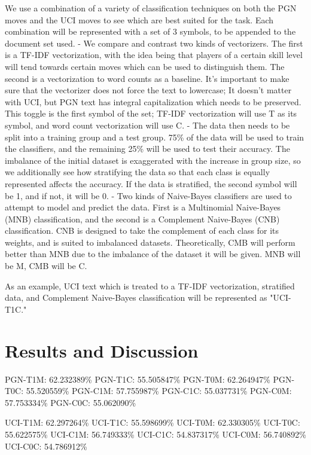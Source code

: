 \documentclass[conference]{IEEEtran}
\begin{document}
We use a combination of a variety of classification techniques on both the PGN moves and the UCI moves to see which are best suited for the task. Each combination will be represented with a set of 3 symbols, to be appended to the document set used.
- We compare and contrast two kinds of vectorizers. The first is a TF-IDF vectorization, with the idea being that players of a certain skill level will tend towards certain moves which can be used to distinguish them. The second is a vectorization to word counts as a baseline. It's important to make sure that the vectorizer does not force the text to lowercase; It doesn't matter with UCI, but PGN text has integral capitalization which needs to be preserved. This toggle is the first symbol of the set; TF-IDF vectorization will use T as its symbol, and word count vectorization will use C.
- The data then needs to be split into a training group and a test group. 75\% of the data will be used to train the classifiers, and the remaining 25\% will be used to test their accuracy. The imbalance of the initial dataset is exaggerated with the increase in group size, so we additionally see how stratifying the data so that each class is equally represented affects the accuracy. If the data is stratified, the second symbol will be 1, and if not, it will be 0.
- Two kinds of Naive-Bayes classifiers are used to attempt to model and predict the data. First is a Multinomial Naive-Bayes (MNB) classification, and the second is a Complement Naive-Bayes (CNB) classification. CNB is designed to take the complement of each class for its weights, and is suited to imbalanced datasets. Theoretically, CMB will perform better than MNB due to the imbalance of the dataset it will be given. MNB will be M, CMB will be C.

As an example, UCI text which is treated to a TF-IDF vectorization, stratified data, and Complement Naive-Bayes classification will be represented as "UCI-T1C."

\section{Results and Discussion}

PGN-T1M: 62.232389\%
PGN-T1C: 55.505847\%
PGN-T0M: 62.264947\%
PGN-T0C: 55.520559\%
PGN-C1M: 57.755987\%
PGN-C1C: 55.037731\%
PGN-C0M: 57.753334\%
PGN-C0C: 55.062090\%

UCI-T1M: 62.297264\%
UCI-T1C: 55.598699\%
UCI-T0M: 62.330305\%
UCI-T0C: 55.622575\%
UCI-C1M: 56.749333\%
UCI-C1C: 54.837317\%
UCI-C0M: 56.740892\%
UCI-C0C: 54.786912\%
\end{document}
